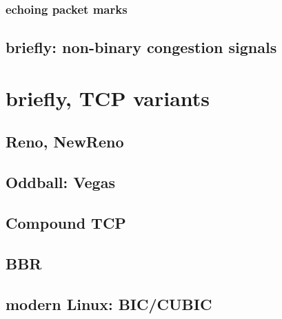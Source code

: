 \subsubsection{echoing packet marks}

\subsection{briefly: non-binary congestion signals}

\section{briefly, TCP variants}

\subsection{Reno, NewReno}

\subsection{Oddball: Vegas}

\subsection{Compound TCP}

\subsection{BBR}

\subsection{modern Linux: BIC/CUBIC}
